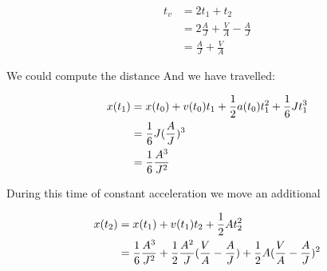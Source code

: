 \documentclass{article}
\begin{document}
\begin{align}
t_v &= 2 t_1 + t_2 \\
    &= 2 \frac{A}{J} + \frac{V}{A} - \frac{A}{J} \\
    &= \frac{A}{J} + \frac{V}{A}
\end{align}

We could compute the distance 
And we have travelled:

\begin{align}
x(t_1) &= x(t_0) + v(t_0) t_1 + \frac{1}{2} a(t_0) t_1^2 + \frac{1}{6} J t_1^3 \\
       &= \frac{1}{6} J (\frac{A}{J})^3 \\
       &= \frac{1}{6} \frac{A^3}{J^2}
\end{align}

During this time of constant acceleration we move an additional

\begin{align}
x(t_2) &= x(t_1) + v(t_1) t_2 + \frac{1}{2} A t_2^2 \\
       &= \frac{1}{6} \frac{A^3}{J^2} + \frac{1}{2} \frac{A^2}{J} (\frac{V}{A} - \frac{A}{J}) + \frac{1}{2} A (\frac{V}{A} - \frac{A}{J})^2 \\
\end{align}
\end{document}
